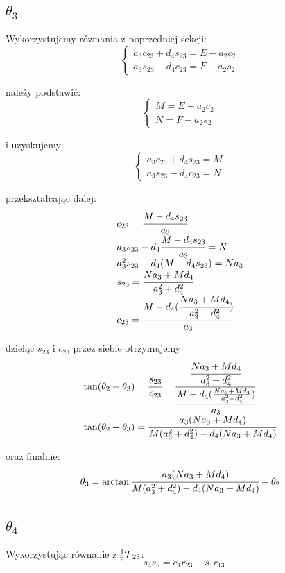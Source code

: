 \documentclass[]{article}
\newcommand\T{\mathcal{T}}
\begin{document}
\subsection{$\theta_3$}
Wykorzystujemy równania z poprzedniej sekcji:
\[\left\{\begin{array}{l}
a_3c_{23} + d_4s_{23} = E - a_2c_2 \\
a_3s_{23} - d_4c_{23} = F - a_2s_2
\end{array}\right.\]

należy podstawić:
\[\left\{\begin{array}{l}
M = E - a_2c_2 \\
N = F - a_2s_2
\end{array}\right.\]

i uzyskujemy:
\[\left\{\begin{array}{l}
a_3c_{23} + d_4s_{23} = M \\
a_3s_{23} - d_4c_{23} = N
\end{array}\right.\]

przekształcając dalej:
\[\begin{array}{l}
c_{23} = \cfrac{M - d_4s_{23}}{a_3} \\
a_3s_{23} - d_4\cfrac{M - d_4s_{23}}{a_3} = N \\
a_3^2s_{23} - d_4(M - d_4s_{23}) = Na_3 \\
s_{23} = \cfrac{Na_3 + Md_4}{a_3^2 + d_4^2} \\
c_{23} = \cfrac{M - d_4(\cfrac{Na_3 + Md_4}{a_3^2 + d_4^2})}{a_3}
\end{array}\]

dzieląc $s_{23}$ i $c_{23}$ przez siebie otrzymujemy
\[\begin{array}{l}
\tan(\theta_2 + \theta_3) = \cfrac{s_{23}}{c_{23}} = \cfrac{\cfrac{Na_3 + Md_4}{a_3^2 + d_4^2}}{\cfrac{M - d_4(\frac{Na_3 + Md_4}{a_3^2 + d_4^2})}{a_3}} \\
\tan(\theta_2 + \theta_3) = \cfrac{a_3(Na_3 + Md_4)}{M(a_3^2 + d_4^2) - d_4(Na_3 + Md_4)} \\
\end{array}\]

oraz finalnie:
\[
\theta_3 = \arctan{\cfrac{a_3(Na_3 + Md_4)}{M(a_3^2 + d_4^2) - d_4(Na_3 + Md_4)}} - \theta_2
\]

\subsection{$\theta_4$}
Wykorzystując równanie z $\prescript{1}{6}{\T}_{23}$:
\[
- s_4s_5 = c_1r_{23} - s_1r_{13}
\]
\end{document}
